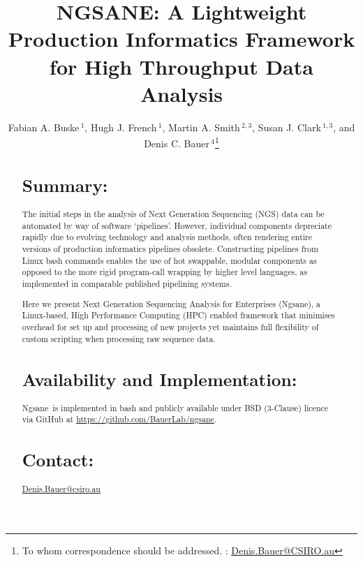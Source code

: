 \documentclass{bioinfo}
\newcommand{\prog}{{\sc Ngsane}}
\begin{document}

\title[NGSANE]{NGSANE: A Lightweight Production Informatics Framework for High Throughput Data Analysis}
\author[Fabian A. Buske {\em et al.}]{Fabian A. Buske\,$^{1}$,
Hugh J. French\,$^{1}$,
Martin A. Smith\,$^{2,3}$,
Susan J. Clark\,$^{1,3}$,
and Denis C. Bauer\,$^{4}$\footnote{To whom correspondence should be addressed. : \href{Denis.Bauer@CSIRO.au}{Denis.Bauer@CSIRO.au}}}
\address{
          $^{1}$Cancer Epigenetics Program, Cancer Research Division, Kinghorn Cancer Centre, Garvan Institute of Medical Research, Sydney 2010, Australia
          $^{2}$RNA Biology and Plasticity Laboratory, Garvan Institute of Medical Research, Sydney 2010, Australia
          $^{3}$St Vincent's Clinical School, University of NSW, Sydney 2010, Australia
          $^{4}$Division of Computational Informatics, CSIRO, Sydney 2113, Australia
}



\maketitle

\begin{abstract}
\section{Summary:} The initial steps in the analysis of Next Generation Sequencing (NGS) data can be automated by way of software `pipelines'. However, individual components depreciate rapidly due to evolving technology and analysis methods, often rendering entire versions of production informatics pipelines obsolete.
Constructing pipelines from Linux bash commands enables the use of hot swappable, modular components as opposed to the more rigid program-call wrapping by higher level languages, as implemented in comparable published pipelining systems.

Here we present Next Generation Sequencing Analysis for Enterprises (\prog), a Linux-based, High Performance Computing (HPC) enabled framework that minimises overhead for set up and processing of new projects yet maintains full flexibility of custom scripting when processing raw sequence data.
\section{Availability and Implementation:} \prog\ is implemented in bash and publicly available under BSD (3-Clause) licence via GitHub at \url{https://github.com/BauerLab/ngsane}. 
\section{Contact:} \href{Denis.Bauer@csiro.au}{Denis.Bauer@csiro.au}
\end{abstract}
\end{document}
